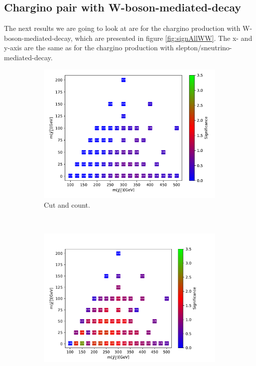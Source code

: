 \subsection{Chargino pair with W-boson-mediated-decay}
\label{sec:resC1C1_WW}

The next results we are going to look at are for the chargino production with W-boson-mediated-decay, which are presented in figure \ref{fig:signAllWW}. The x- and y-axis are the same as for the chargino production with slepton/sneutrino-mediated-decay. 

\begin{figure}[H]
    \centering
    \begin{subfigure}[t!]{0.49\textwidth}
    \includegraphics[width = \textwidth]{Figures/Significances/significanceCutandCount_WW_all.pdf}
    \caption{Cut and count.}
        \label{fig:signAllWWcandc}
    \end{subfigure}
    \\
    \begin{subfigure}[t!]{0.49\textwidth}
    \includegraphics[width = \textwidth]{Figures/Significances/significance_BDT_WW_All_level.pdf}

\end{subfigure}
\end{figure}
